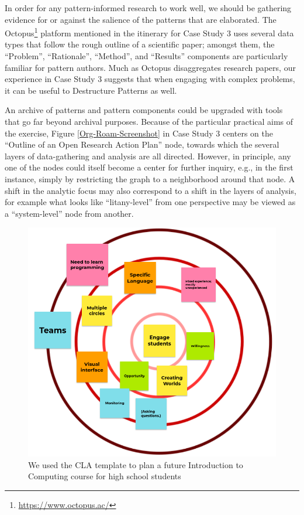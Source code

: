 \documentclass[acmlarge,timestamp]{acmart}
\begin{document}
In order for any pattern-informed research to work well, we should be
gathering evidence for or against the salience of the patterns that
are elaborated.  The Octopus\footnote{\url{https://www.octopus.ac/}}
platform mentioned in the itinerary for Case Study 3 uses several data
types that follow the rough outline of a scientific paper; amongst
them, the “Problem”, “Rationale”, “Method”, and “Results” components
are particularly familiar for pattern authors.  Much as Octopus
disaggregates research papers, our experience in Case Study 3 suggests
that when engaging with complex problems, it can be useful to {\sc
  Destructure Patterns} as well.

An archive of patterns and pattern components could be upgraded with
tools that go far beyond archival purposes.  Because of the particular
practical aims of the exercise, Figure \ref{Org-Roam-Screenshot} in
Case Study 3 centers on the “Outline of an Open Research Action Plan”
node, towards which the several layers of data-gathering and analysis
are all directed.  However, in principle, any one of the nodes could
itself become a center for further inquiry, e.g., in the first
instance, simply by restricting the graph to a neighborhood around
that node.  A shift in the analytic focus may also correspond to a
shift in the layers of analysis, for example what looks like
“litany-level” from one perspective may be viewed as a “system-level”
node from another.

\begin{figure}
\includegraphics[width=.7\textwidth]{sridevi-course.png}
\caption{We used the CLA template to plan a future Introduction to Computing course for high school students\label{sridevi-course}}
\end{figure}
\end{document}
